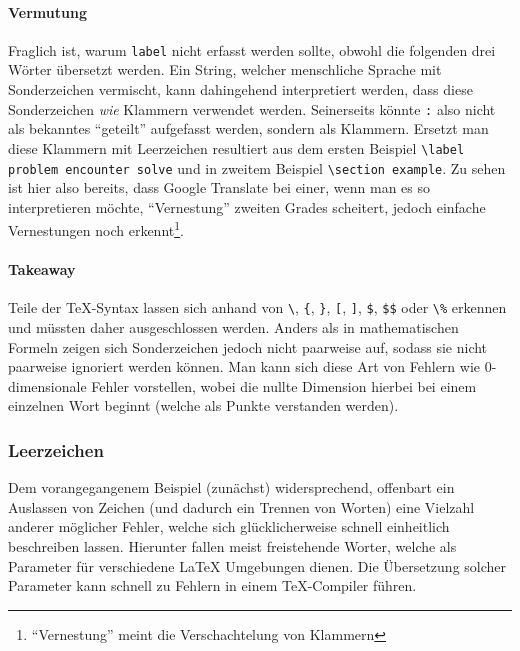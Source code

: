 \paragraph*{Vermutung}
Fraglich ist, warum \texttt{label} nicht erfasst werden sollte, obwohl die folgenden drei Wörter übersetzt werden. Ein String, welcher menschliche Sprache mit Sonderzeichen vermischt, kann dahingehend interpretiert werden, dass diese Sonderzeichen \textit{wie} Klammern verwendet werden. Seinerseits könnte \verb|:| also nicht als bekanntes \enquote{geteilt} aufgefasst werden, sondern als Klammern. Ersetzt man diese Klammern mit Leerzeichen resultiert aus dem ersten Beispiel \verb|\label problem encounter solve| und in zweitem Beispiel \verb|\section example|. Zu sehen ist hier also bereits, dass Google Translate bei einer, wenn man es so interpretieren möchte, \enquote{Vernestung} zweiten Grades scheitert, jedoch einfache Vernestungen noch erkennt\footnote{\enquote{Vernestung} meint die Verschachtelung von Klammern}.

\newpage

\paragraph*{Takeaway}
Teile der \TeX{}-Syntax lassen sich anhand von \verb|\|, \verb|{|, \verb|}|, \verb|[|, \verb|]|, \verb|$|, \verb|$$| oder \verb|\%| erkennen und müssten daher ausgeschlossen werden. Anders als in mathematischen Formeln zeigen sich Sonderzeichen jedoch nicht paarweise auf, sodass sie nicht paarweise ignoriert werden können. Man kann sich diese Art von Fehlern wie 0-dimensionale Fehler vorstellen, wobei die nullte Dimension hierbei bei einem einzelnen Wort beginnt (welche als Punkte verstanden werden).%



\subsubsection{Leerzeichen}\label{problems:dim1}%
Dem vorangegangenem Beispiel (zunächst) widersprechend, offenbart ein Auslassen von Zeichen (und dadurch ein Trennen von Worten) eine Vielzahl anderer möglicher Fehler, welche sich glücklicherweise schnell einheitlich beschreiben lassen.%
Hierunter fallen meist freistehende Worter, welche als Parameter für verschiedene \LaTeX{} Umgebungen dienen. Die Übersetzung solcher Parameter kann schnell zu Fehlern in einem \TeX{}-Compiler führen.

